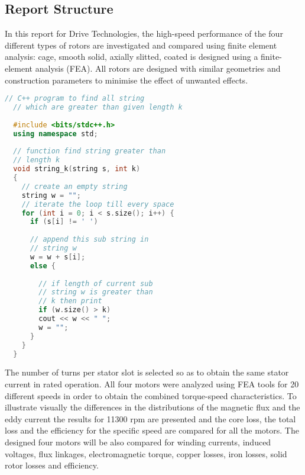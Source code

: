 \subsection{Report Structure} %

In this report for Drive Technologies, the high-speed performance of the four
different types of rotors are investigated and compared using finite element analysis:
cage, smooth solid, axially slitted, coated is designed using a finite-element
analysis (FEA). All rotors are designed with similar geometries and construction parameters
to minimise the effect of unwanted effects.

\begin{lstlisting}[language=C++]  
  // C++ program to find all string
  // which are greater than given length k 
  
  #include <bits/stdc++.h> 
  using namespace std;
   
  // function find string greater than
  // length k 
  void string_k(string s, int k) 
  {
    // create an empty string
    string w = "";
    // iterate the loop till every space
    for (int i = 0; i < s.size(); i++) {
      if (s[i] != ' ')
      
      // append this sub string in
      // string w
      w = w + s[i];
      else {
        
        // if length of current sub
        // string w is greater than 
        // k then print
        if (w.size() > k)
        cout << w << " "; 
        w = "";
      }
    }
  }
\end{lstlisting}

The number of turns per stator slot is selected so as to obtain the
same stator current in rated operation. All four motors were analyzed using FEA
tools for 20 different speeds in order to obtain the combined torque-speed
characteristics. To illustrate visually the differences in the distributions of the
magnetic flux and the eddy current the results for 11300 rpm are presented and the
core loss, the total loss and the efficiency for the specific speed are compared for all
the motors. The designed four motors will be also compared for winding currents,
induced voltages, flux linkages, electromagnetic torque, copper losses, iron losses,
solid rotor losses and efficiency.
